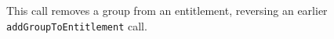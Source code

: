 This call removes a group from an entitlement, reversing an earlier \verb+addGroupToEntitlement+ call.
